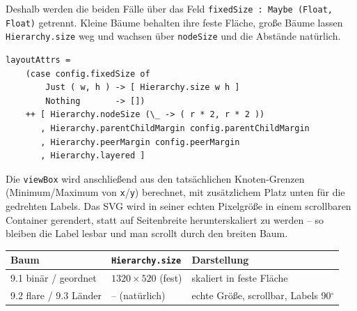 \documentclass[11pt,a4paper]{article}
\begin{document}
Deshalb werden die beiden Fälle über das Feld
\texttt{fixedSize : Maybe (Float, Float)} getrennt. Kleine Bäume behalten ihre
feste Fläche, große Bäume lassen \texttt{Hierarchy.size} weg und wachsen über
\texttt{nodeSize} und die Abstände natürlich.

\begin{verbatim}
layoutAttrs =
    (case config.fixedSize of
        Just ( w, h ) -> [ Hierarchy.size w h ]
        Nothing       -> [])
    ++ [ Hierarchy.nodeSize (\_ -> ( r * 2, r * 2 ))
       , Hierarchy.parentChildMargin config.parentChildMargin
       , Hierarchy.peerMargin config.peerMargin
       , Hierarchy.layered ]
\end{verbatim}

Die \texttt{viewBox} wird anschließend aus den tatsächlichen Knoten-Grenzen
(Minimum/Maximum von \texttt{x}/\texttt{y}) berechnet, mit zusätzlichem Platz
unten für die gedrehten Labels. Das SVG wird in seiner echten Pixelgröße in
einem scrollbaren Container gerendert, statt auf Seitenbreite herunterskaliert
zu werden -- so bleiben die Label lesbar und man scrollt durch den breiten Baum.

\begin{center}
\begin{tabular}{lll}
\toprule
Baum & \texttt{Hierarchy.size} & Darstellung \\
\midrule
9.1 binär / geordnet & $1320 \times 520$ (fest) & skaliert in feste Fläche \\
9.2 flare / 9.3 Länder & -- (natürlich) & echte Größe, scrollbar, Labels 90$^\circ$ \\
\bottomrule
\end{tabular}
\end{center}
\end{document}
